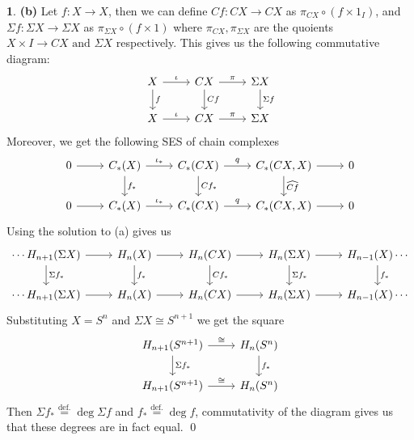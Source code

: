 \documentclass[10.5pt]{article}
\theoremstyle{definition}
\newtheorem{pb}{}
\newcommand{\tand}{\text{ and }}
\begin{document}
\begin{pb}
        \textbf{(b)} Let \(f: X \to X\), then we can define \(Cf: CX \to CX\) as \(\pi_{CX} \circ (f \times 1_I)\), and \(\Sigma f: \Sigma X \to \Sigma X\) as \(\pi_{\Sigma X} \circ (f \times 1)\) where \(\pi_{CX},\pi_{\Sigma X}\) are the quoients \(X \times I \to CX \tand \Sigma X\) respectively. This gives us the following commutative diagram:
        \begin{equation*}
            \begin{tikzcd}
                X \arrow[d,"f"] \arrow[r,"\iota"] &CX \arrow[d,"Cf"] \arrow[r,"\pi"] &\Sigma X \arrow[d,"\Sigma f"] \\
                X \arrow[r,"\iota"] &CX \arrow[r,"\pi"] &\Sigma X
            \end{tikzcd}
        \end{equation*}
        Moreover, we get the following SES of chain complexes
        \begin{equation*}
            \begin{tikzcd}
                0 \arrow[r,""] &C_*(X) \arrow[d,"f_*"] \arrow[r,"\iota_*"] &C_*(CX) \arrow[d,"Cf_*"] \arrow[r,"q"] &C_*(CX,X) \arrow[d,"\widehat{Cf}"] \arrow[r,""] &0 \\
                0 \arrow[r,""] &C_*(X) \arrow[r,"\iota_*"] &C_*(CX) \arrow[r,"q"] &C_*(CX,X) \arrow[r,""] &0
            \end{tikzcd}
        \end{equation*}
        Using the solution to (a) gives us
        \begin{equation*}
            \begin{tikzcd}
                \cdots H_{n+1}(\Sigma X) \arrow[d,"\Sigma f_*"] \arrow[r,""] &H_{n}(X) \arrow[r,""] \arrow[d,"f_*"] &H_{n}(CX) \arrow[r,""] \arrow[d,"Cf_*"] &H_n(\Sigma X) \arrow[r,""] \arrow[d,"\Sigma f_*"] & H_{n-1}(X) \arrow[d,"f_*"]\cdots \\
                \cdots H_{n+1}(\Sigma X) \arrow[r,""] &H_{n}(X) \arrow[r,""] &H_{n}(CX) \arrow[r,""] &H_n(\Sigma X) \arrow[r,""] & H_{n-1}(X)\cdots
            \end{tikzcd}
        \end{equation*}
        Substituting \(X = S^n\) and \(\Sigma X \cong S^{n+1}\) we get the square
        \begin{equation*}
            \begin{tikzcd}
                H_{n+1}(S^{n+1})\arrow[d, "\Sigma f_*"] \arrow[r,"\cong"] &H_{n}(S^n) \arrow[d,"f_*"] \\
                H_{n+1}(S^{n+1}) \arrow[r,"\cong"] &H_{n}(S^n)
            \end{tikzcd}
        \end{equation*}
        Then \(\Sigma f_* \overset{\text{def.}}{=} \deg \Sigma f\) and \(f_* \overset{\text{def.}}{=} \deg f\), commutativity of the diagram gives us that these degrees are in fact equal. \qed
    \end{pb}
\end{document}

